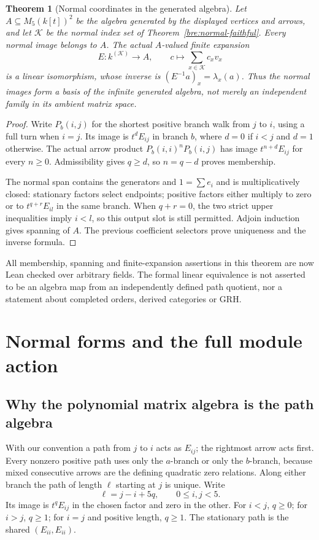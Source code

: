 \documentclass[11pt,oneside,openany]{book}
\newtheorem{theorem}{Theorem}[chapter]
\theoremstyle{definition}\newtheorem{definition}[theorem]{Definition}
\theoremstyle{remark}\newtheorem{remark}[theorem]{Remark}
\begin{document}
\begin{theorem}[Normal coordinates in the generated algebra]\label{bre:normal-generated}
Let $A\subseteq M_5(k[t])^2$ be the algebra generated by the displayed
vertices and arrows, and let $\mathcal K$ be the normal index set of
Theorem~\ref{bre:normal-faithful}. Every normal image belongs to $A$.
The actual $A$-valued finite expansion
\[
 E:k^{(\mathcal K)}\longrightarrow A,\qquad
 c\longmapsto\sum_{x\in\mathcal K}c_xv_x
\]
is a linear isomorphism, whose inverse is $(E^{-1}a)_x=\lambda_x(a)$.
Thus the normal images form a basis of the infinite generated algebra,
not merely an independent family in its ambient matrix space.
\end{theorem}
\begin{proof}
Write $P_b(i,j)$ for the shortest positive branch walk from $j$ to $i$,
using a full turn when $i=j$. Its image is $t^dE_{ij}$ in branch $b$,
where $d=0$ if $i<j$ and $d=1$ otherwise. The actual arrow product
$P_b(i,i)^nP_b(i,j)$ has image $t^{n+d}E_{ij}$ for every $n\geq0$.
Admissibility gives $q\geq d$, so $n=q-d$ proves membership.

The normal span contains the generators and $1=\sum e_i$ and is
multiplicatively closed: stationary factors select endpoints; positive
factors either multiply to zero or to $t^{q+r}E_{il}$ in the same branch.
When $q+r=0$, the two strict upper inequalities imply $i<l$, so this
output slot is still permitted. Adjoin induction gives spanning of $A$.
The previous coefficient selectors prove uniqueness and the inverse formula.
\end{proof}
All membership, spanning and finite-expansion assertions in this theorem
are now Lean checked over arbitrary fields. The formal linear equivalence
is not asserted to be an algebra map from an independently defined path
quotient, nor a statement about completed orders, derived categories or GRH.

\section{Normal forms and the full module action}\label{bre:details}
\subsection{Why the polynomial matrix algebra is the path algebra}
With our convention a path from $j$ to $i$ acts as $E_{ij}$; the
rightmost arrow acts first. Every nonzero positive path uses only the
$a$-branch or only the $b$-branch, because mixed consecutive arrows
are the defining quadratic zero relations. Along either branch the path
of length $\ell$ starting at $j$ is unique. Write
\[
 \ell=j-i+5q,\qquad 0\leq i,j<5.
\]
Its image is $t^qE_{ij}$ in the chosen factor and zero in the other.
For $i<j$, $q\geq0$; for $i>j$, $q\geq1$; for $i=j$ and
positive length, $q\geq1$. The stationary path is the shared
$(E_{ii},E_{ii})$.
\end{document}
